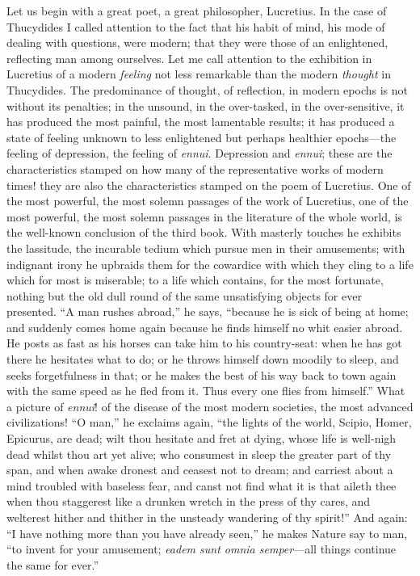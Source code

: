 Let us begin with a great poet, a great philosopher, Lucretius. In the
case of Thucydides I called attention to the fact that his habit of
mind, his mode of dealing with questions, were modern; that they were
those of an enlightened, reflecting man among ourselves. Let me call
attention to the exhibition in Lucretius of a modern \emph{feeling} not
less remarkable than the modern \emph{thought} in Thucydides. The
predominance of thought, of reflection, in modern epochs is not without
its penalties; in the unsound, in the over-tasked, in the
over-sensitive, it has produced the most painful, the most lamentable
results; it has produced a state of feeling unknown to less enlightened
but perhaps healthier epochs---the feeling of depression, the feeling of
\emph{ennui}. Depression and \emph{ennui}; these are the characteristics
stamped on how many of the representative works of modern times! they
are also the characteristics stamped on the poem of Lucretius. One of
the most powerful, the most solemn passages of the work of Lucretius,
one of the most powerful, the most solemn passages in the literature of
the whole world, is the well-known conclusion of the third book. With
masterly touches he exhibits the lassitude, the incurable tedium which
pursue men in their amusements; with indignant irony he upbraids them
for the cowardice with which they cling to a life which for most is
miserable; to a life which contains, for the most fortunate, nothing but
the old dull round of the same unsatisfying objects for ever presented.
``A man rushes abroad,'' he says, ``because he is sick of being at home;
and suddenly comes home again because he finds himself no whit easier
abroad. He posts as fast as his horses can take him to his country-seat:
when he has got there he hesitates what to do; or he throws himself down
moodily to sleep, and seeks forgetfulness in that; or he makes the best
of his way back to town again with the same speed as he fled from it.
Thus every one flies from himself.'' What a picture of \emph{ennui}! of
the disease of the most modern societies, the most advanced
civilizations! ``O man,'' he exclaims again, ``the lights of the world,
Scipio, Homer, Epicurus, are dead; wilt thou hesitate and fret at dying,
whose life is well-nigh dead whilst thou art yet alive; who consumest in
sleep the greater part of thy span, and when awake dronest and ceasest
not to dream; and carriest about a mind troubled with baseless fear, and
canst not find what it is that aileth thee when thou staggerest like a
drunken wretch in the press of thy cares, and welterest hither and
thither in the unsteady wandering of thy spirit!'' And again: ``I have
nothing more than you have already seen,'' he makes Nature say to man,
``to invent for your amusement; \emph{eadem sunt omnia semper}---all
things continue the same for ever.''

